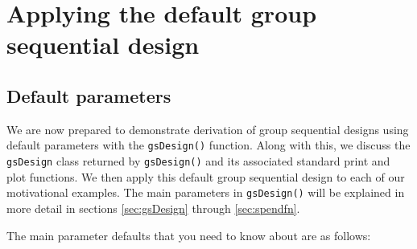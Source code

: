 \section{Applying the default group sequential design\label{sec:default}}
\subsection{Default parameters}
We are now prepared to demonstrate derivation of group sequential designs using default parameters with the \texttt{gsDesign()} function.
Along with this, we discuss the \texttt{gsDesign} class returned by \texttt{gsDesign()} and its associated standard print and plot functions. 
We then apply this default group sequential design to each of our motivational examples. 
The main parameters in \texttt{gsDesign()} will be explained in more detail in sections \ref{sec:gsDesign} through \ref{sec:spendfn}.

The main parameter defaults that you need to know about are as follows:

